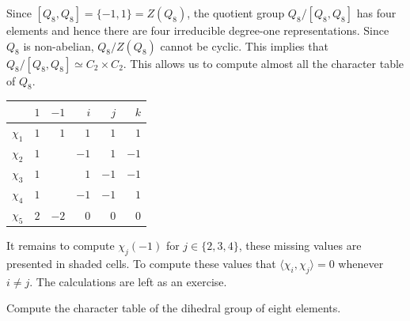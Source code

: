 \begin{example}
	Since $[Q_8,Q_8]=\{-1,1\}=Z(Q_8)$, the quotient group $Q_8/[Q_8,Q_8]$ has four elements and
	hence there are four irreducible degree-one representations. Since 
	$Q_8$ is non-abelian, $Q_8/Z(Q_8)$ cannot be cyclic. 
	This implies that 
	$Q_8/[Q_8,Q_8]\simeq C_2\times C_2$. This allows us
	to compute almost all the character table of $Q_8$. 
		\begin{center}
		\begin{tabular}{|c|rrrrr|}
			\hline
			& $1$ & $-1$ & $i$ & $j$ & $k$\tabularnewline
			\hline
			$\chi_1$ & $1$ & $1$ & $1$ & $1$ & $1$\tabularnewline
			$\chi_2$ & $1$ & \cellcolor{gray!30}{$1$} & $-1$ & $1$ & $-1$\tabularnewline
			$\chi_3$ & $1$ & \cellcolor{gray!30}{$1$} & $1$ & $-1$ & $-1$\tabularnewline
			$\chi_4$ & $1$ & \cellcolor{gray!30}{$1$} & $-1$ & $-1$ & $1$\tabularnewline
			$\chi_5$ & $2$ & $-2$ & $0$ & $0$ & $0$\tabularnewline
			\hline
		\end{tabular}
	\end{center}
	It remains to compute $\chi_j(-1)$ for $j\in\{2,3,4\}$, these missing values are presented in shaded
    cells. To compute these values that $\langle\chi_i,\chi_j\rangle=0$ whenever $i\ne j$. The calculations
    are left as an exercise. 



\end{example}

\begin{exercise}
    Compute the character table of the dihedral group of eight elements. 
\end{exercise}

